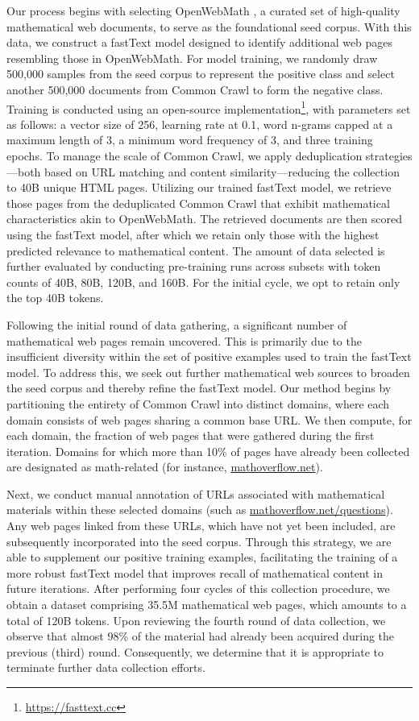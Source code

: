 \begin{itemize}[topsep=0pt]
\begin{itemize}[topsep=0pt]
Our process begins with selecting OpenWebMath \citep{openwebmath}, a curated set of high-quality mathematical web documents, to serve as the foundational seed corpus. With this data, we construct a fastText model \citep{joulin2016fasttext} designed to identify additional web pages resembling those in OpenWebMath. For model training, we randomly draw 500,000 samples from the seed corpus to represent the positive class and select another 500,000 documents from Common Crawl to form the negative class. Training is conducted using an open-source implementation\footnote{\url{https://fasttext.cc}}, with parameters set as follows: a vector size of 256, learning rate at 0.1, word n-grams capped at a maximum length of 3, a minimum word frequency of 3, and three training epochs. To manage the scale of Common Crawl, we apply deduplication strategies—both based on URL matching and content similarity—reducing the collection to 40B unique HTML pages. Utilizing our trained fastText model, we retrieve those pages from the deduplicated Common Crawl that exhibit mathematical characteristics akin to OpenWebMath. The retrieved documents are then scored using the fastText model, after which we retain only those with the highest predicted relevance to mathematical content. The amount of data selected is further evaluated by conducting pre-training runs across subsets with token counts of 40B, 80B, 120B, and 160B. For the initial cycle, we opt to retain only the top 40B tokens.

Following the initial round of data gathering, a significant number of mathematical web pages remain uncovered. This is primarily due to the insufficient diversity within the set of positive examples used to train the fastText model. To address this, we seek out further mathematical web sources to broaden the seed corpus and thereby refine the fastText model. Our method begins by partitioning the entirety of Common Crawl into distinct domains, where each domain consists of web pages sharing a common base URL. We then compute, for each domain, the fraction of web pages that were gathered during the first iteration. Domains for which more than 10\% of pages have already been collected are designated as math-related (for instance, \url{mathoverflow.net}).

Next, we conduct manual annotation of URLs associated with mathematical materials within these selected domains (such as \url{mathoverflow.net/questions}). Any web pages linked from these URLs, which have not yet been included, are subsequently incorporated into the seed corpus. Through this strategy, we are able to supplement our positive training examples, facilitating the training of a more robust fastText model that improves recall of mathematical content in future iterations. After performing four cycles of this collection procedure, we obtain a dataset comprising 35.5M mathematical web pages, which amounts to a total of 120B tokens. Upon reviewing the fourth round of data collection, we observe that almost 98\% of the material had already been acquired during the previous (third) round. Consequently, we determine that it is appropriate to terminate further data collection efforts.


\end{itemize}
\end{itemize}
